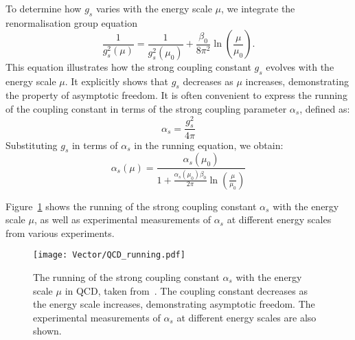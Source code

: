         To determine how $g_s$ varies with the energy scale $\mu$, we integrate the renormalisation group equation
        \begin{equation}
            \frac{1}{g_s^2(\mu)} = \frac{1}{g_s^2(\mu_0)} + \frac{\beta_0}{8\pi^2} \ln \left( \frac{\mu}{\mu_0} \right).
        \end{equation}
        This equation illustrates how the strong coupling constant  $g_s$  evolves with the energy scale $\mu$. It 
        explicitly shows that $g_s$ decreases as $\mu$ increases, demonstrating the property of asymptotic freedom.
        It is often convenient to express the running of the coupling constant in terms of the strong coupling parameter \( \alpha_s \), defined as:
        \begin{equation}
            \alpha_s = \frac{g_s^2}{4\pi}
        \end{equation}
        Substituting $g_s$ in terms of $\alpha_s$ in the running equation, we obtain:
        \begin{equation}
            \alpha_s(\mu) = \frac{\alpha_s(\mu_0)}{1 + \frac{\alpha_s(\mu_0) \beta_0}{2\pi} \ln \left( \frac{\mu}{\mu_0} \right)}
        \end{equation}

        Figure~\ref{fig:QCD_running} shows the running of the strong coupling constant $\alpha_s$ with the energy scale $\mu$, as well 
        as experimental measurements of $\alpha_s$ at different energy scales from various experiments.
        \begin{figure}[htbp]
            \centering
            \texttt{[image: Vector/QCD\_running.pdf]}
            \caption{
                The running of the strong coupling constant $\alpha_s$ with the energy scale $\mu$ in QCD, taken from~\cite{STDM-2018-51}.
                The coupling constant decreases as the energy scale increases, demonstrating asymptotic freedom.
                The experimental measurements of $\alpha_s$ at different energy scales are also shown.
            }
            \label{fig:QCD_running}
        \end{figure}

